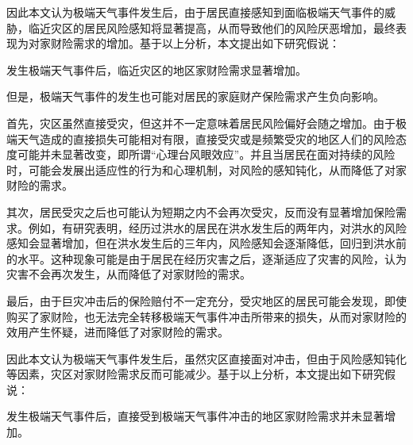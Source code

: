 因此本文认为极端天气事件发生后，由于居民直接感知到面临极端天气事件的威胁，临近灾区的居民风险感知将显著提高，从而导致他们的风险厌恶增加，最终表现为对家财险需求的增加。基于以上分析，本文提出如下研究假说：

\begin{hyp}
    \label{hyp:3}
    发生极端天气事件后，临近灾区的地区家财险需求显著增加。
\end{hyp}

但是，极端天气事件的发生也可能对居民的家庭财产保险需求产生负向影响。

首先，灾区虽然直接受灾，但这并不一定意味着居民风险偏好会随之增加。由于极端天气造成的直接损失可能相对有限，直接受灾或是频繁受灾的地区人们的风险态度可能并未显著改变\citep{shao2024typhoons}，即所谓“心理台风眼效应”\citep{谢晓非2012心理台风眼效应研究综述}。并且当居民在面对持续的风险时，可能会发展出适应性的行为和心理机制\citep{gigerenzer2011heuristic,BXYJ201312009}，对风险的感知钝化，从而降低了对家财险的需求。

其次，居民受灾之后也可能认为短期之内不会再次受灾，反而没有显著增加保险需求。例如，有研究表明，经历过洪水的居民在洪水发生后的两年内，对洪水的风险感知会显著增加，但在洪水发生后的三年内，风险感知会逐渐降低，回归到洪水前的水平\citep{cheong2022natural}。这种现象可能是由于居民在经历灾害之后，逐渐适应了灾害的风险，认为灾害不会再次发生，从而降低了对家财险的需求。

最后，由于巨灾冲击后的保险赔付不一定充分\citep{MumoWatt2017}，受灾地区的居民可能会发现，即使购买了家财险，也无法完全转移极端天气事件冲击所带来的损失，从而对家财险的效用产生怀疑，进而降低了对家财险的需求。

因此本文认为极端天气事件发生后，虽然灾区直接面对冲击，但由于风险感知钝化等因素，灾区对家财险需求反而可能减少。基于以上分析，本文提出如下研究假说：
\begin{hyp}
    \label{hyp:2}
    发生极端天气事件后，直接受到极端天气事件冲击的地区家财险需求并未显著增加。
\end{hyp}

